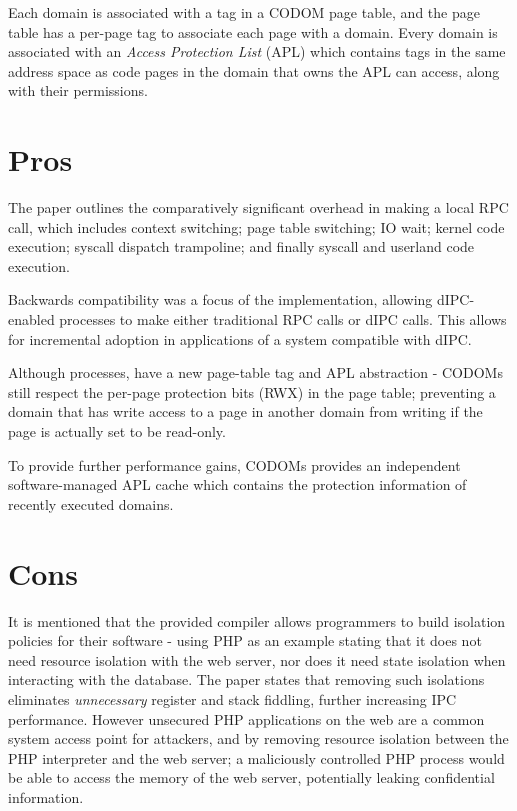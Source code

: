 \documentclass{article}
\begin{document}
Each domain is associated with a tag in a CODOM page table, and the page table has a per-page tag to associate each page with a domain. Every domain is  associated with an \textit{Access Protection List} (APL) which contains tags in the same address space as code pages in the domain that owns the APL can access, along with their permissions.

\section*{Pros}
The paper outlines the comparatively significant overhead in making a local RPC call, which includes context switching; page table switching; IO wait; kernel code execution; syscall dispatch trampoline; and finally syscall and userland code execution.

Backwards compatibility was a focus of the implementation, allowing dIPC-enabled processes to make either traditional RPC calls or dIPC calls. This allows for incremental adoption in applications of a system compatible with dIPC.

Although processes, have a new page-table tag and APL abstraction - CODOMs still respect the per-page protection bits (RWX) in the page table; preventing a domain that has write access to a page in another domain from writing if the page is actually set to be read-only.

To provide further performance gains, CODOMs provides an independent software-managed APL cache which contains the protection information of recently executed domains.


\section*{Cons}
It is mentioned that the provided compiler allows programmers to build isolation policies for their software - using PHP as an example stating that it does not need resource isolation with the web server, nor does it need state isolation when interacting with the database. The paper states that removing such isolations eliminates \textit{unnecessary} register and stack fiddling, further increasing IPC performance. However unsecured PHP applications on the web are a common system access point for attackers, and by removing resource isolation between the PHP interpreter and the web server; a maliciously controlled PHP process would be able to access the memory of the web server, potentially leaking confidential information.
\end{document}
